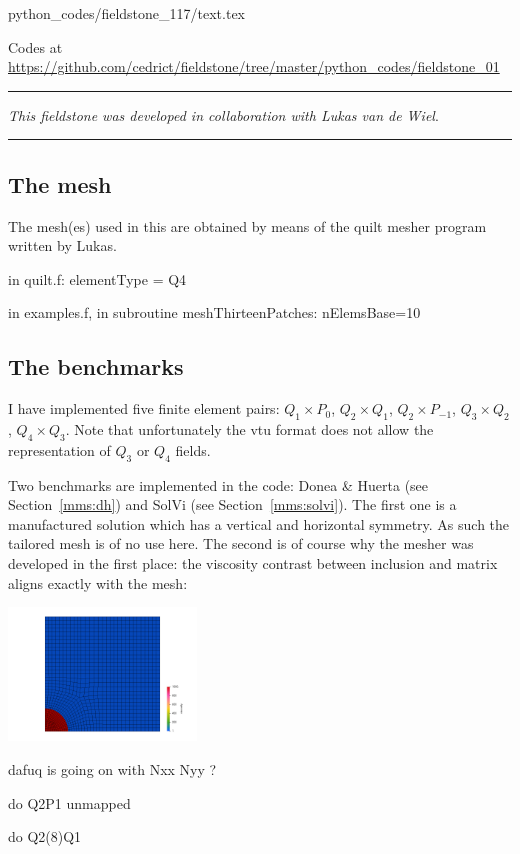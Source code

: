 \begin{flushright} {\tiny {\color{gray} python\_codes/fieldstone\_117/text.tex}} \end{flushright}



\begin{center}

Codes at \url{https://github.com/cedrict/fieldstone/tree/master/python_codes/fieldstone_01}
\end{center}

\par\noindent\rule{\textwidth}{0.4pt}

{\sl This fieldstone was developed in collaboration with Lukas van de Wiel}. 

\par\noindent\rule{\textwidth}{0.4pt}


\subsection*{The mesh}

The mesh(es) used in this \stone are obtained by means of the quilt mesher program written by Lukas. 

in quilt.f: 
elementType = Q4

in examples.f, in subroutine meshThirteenPatches:
nElemsBase=10


\subsection*{The benchmarks}

I have implemented five finite element pairs: $Q_1\times P_0$, $Q_2\times Q_1$, $Q_2 \times P_{-1}$,
$Q_3\times Q_2$, $Q_4\times Q_3$.
Note that unfortunately the vtu format does not allow the representation of $Q_3$ or $Q_4$ fields. 

Two benchmarks are implemented in the code: Donea \& Huerta (see Section~\ref{mms:dh}) and SolVi (see Section~\ref{mms:solvi}).
The first one is a manufactured solution which has a vertical and horizontal symmetry. As such the tailored mesh 
is of no use here. The second is of course why the mesher was developed in the first place: the viscosity contrast between 
inclusion and matrix aligns exactly with the mesh:

\begin{center}
\includegraphics[width=5cm]{python_codes/fieldstone_117/images/visc}
\end{center}

 

dafuq is going on with Nxx Nyy ? 


do Q2P1 unmapped

do Q2(8)Q1


